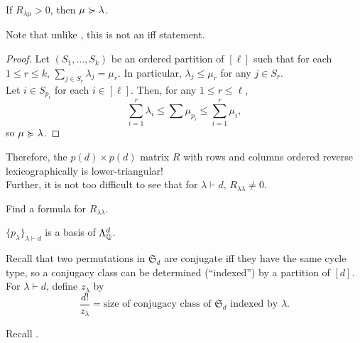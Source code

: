 	\begin{ftheo}
		If $R_{\lambda\mu} > 0$, then $\mu \succcurlyeq \lambda$.
	\end{ftheo}
	Note that unlike , this is not an iff statement.
	\begin{proof}
		Let $(S_1,\ldots,S_k)$ be an ordered partition of $[\ell]$ such that for each $1 \le r \le k$, $\sum_{j \in S_r} \lambda_j = \mu_r$. In particular, $\lambda_j \le \mu_r$ for any $j \in S_r$. \\
		Let $i \in S_{p_i}$ for each $i \in [\ell]$. Then, for any $1 \le r \le \ell$,
		\[ \sum_{i=1}^r \lambda_{i} \le \sum \mu_{p_i} \le \sum_{i=1}^r \mu_{i}, \]
		so $\mu \succcurlyeq \lambda$.
	\end{proof}

	Therefore, the $p(d) \times p(d)$ matrix $R$ with rows and columns ordered reverse lexicographically is lower-triangular!\\
	Further, it is not too difficult to see that for $\lambda \vdash d$, $R_{\lambda\lambda} \ne 0$.
	
	\begin{exercise}
		Find a formula for $R_{\lambda\lambda}$.
	\end{exercise}

	\begin{fcor}
		$\{p_\lambda\}_{\lambda \vdash d}$ is a basis of $\Lambda_{\mathbb{Q}}^d$.
	\end{fcor}

	Recall that two permutations in $\mathfrak{S}_d$ are conjugate iff they have the same cycle type, so a conjugacy class can be determined (``indexed'') by a partition of $[d]$. For $\lambda \vdash d$, define $z_\lambda$ by
	\[ \frac{d!}{z_\lambda} = \text{size of conjugacy class of $\mathfrak{S}_d$ indexed by $\lambda$}. \]

	Recall .

